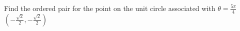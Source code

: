 {Find the ordered pair for the point on the unit circle associated with $\theta=\frac{5\pi}{4}$}
{$(-\frac{\sqrt{2}}{2}, -\frac{\sqrt{2}}{2})$}
